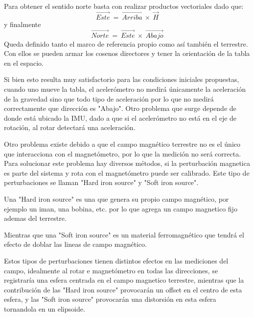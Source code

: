 Para obtener el sentido norte basta con realizar productos vectoriales dado que:
\begin{equation}
\vec{Este} \ = \ \vec{Arriba} \  \times \ \vec{H}
\end{equation}
y finalmente 
\begin{equation}
\vec{Norte} \ = \ \vec{Este} \  \times \ \vec{Abajo}
\end{equation}
Queda definido tanto el marco de referencia propio como así también el terrestre. Con ellos se pueden armar los cosenos directores y tener la orientación de la tabla en el espacio.



Si bien esto resulta muy satisfactorio para las condiciones iniciales propuestas, cuando uno mueve la tabla, el acelerómetro no medirá únicamente la aceleración de la gravedad sino que todo tipo de aceleración por lo que no medirá correctamente que dirección es "Abajo". Otro problema que surge depende de donde está ubicado la IMU, dado a que si el acelerómetro no está en el eje de rotación, al rotar detectará una aceleración. 


Otro problema existe debido a que el campo magnético terrestre no es el único que interacciona con el magnetómetro, por lo que la medición no será correcta. Para solucionar este problema hay diversos métodos, si la perturbación magnetica  es parte del sistema y rota con el magnetómetro puede ser calibrado.
Este tipo de perturbaciones se llaman "Hard iron source" y "Soft iron source".


Una "Hard iron source" es una que genera su propio campo magnético, por ejemplo un iman, una bobina, etc. por lo que agrega un campo magnetico fijo ademas del terrestre.


Mientras que una "Soft iron source" es un material ferromagnético  que tendrá el efecto de doblar las lineas de campo magnético.


Estos tipos de perturbaciones tienen distintos efectos en las mediciones del campo, idealmente al rotar e magnetómetro en todas las direcciones, se registraría una esfera centrada en el campo magnetico terrestre, mientras que la contribución de las "Hard iron source" provocarán un offset en el centro de esta esfera, y las "Soft iron source" provocarán una distorsión en esta esfera tornandola en un elipsoide.

